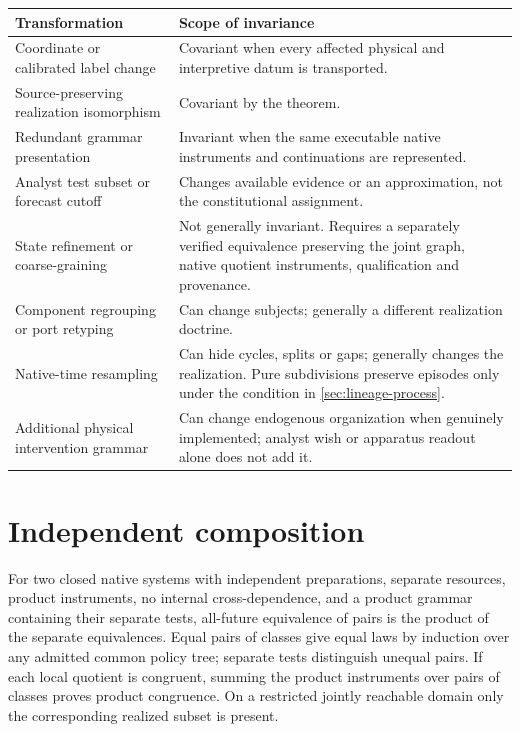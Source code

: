 \begin{center}\small
\begin{tabularx}{\textwidth}{@{}>{\raggedright\arraybackslash}p{}Y@{}}\toprule
Transformation & Scope of invariance\\\midrule
Coordinate or calibrated label change & Covariant when every affected physical and interpretive datum is transported.\\
Source-preserving realization isomorphism & Covariant by the theorem.\\
Redundant grammar presentation & Invariant when the same executable native instruments and continuations are represented.\\
Analyst test subset or forecast cutoff & Changes available evidence or an approximation, not the constitutional assignment.\\
State refinement or coarse-graining & Not generally invariant. Requires a separately verified equivalence preserving the joint graph, native quotient instruments, qualification and provenance.\\
Component regrouping or port retyping & Can change subjects; generally a different realization doctrine.\\
Native-time resampling & Can hide cycles, splits or gaps; generally changes the realization. Pure subdivisions preserve episodes only under the condition in \cref{sec:lineage-process}.\\
Additional physical intervention grammar & Can change endogenous organization when genuinely implemented; analyst wish or apparatus readout alone does not add it.\\\bottomrule
\end{tabularx}
\end{center}

\section{Independent composition}\label{section:completion:independent-composition}
For two closed native systems with independent preparations, separate resources, product instruments, no internal cross-dependence, and a product grammar containing their separate tests, all-future equivalence of pairs is the product of the separate equivalences. Equal pairs of classes give equal laws by induction over any admitted common policy tree; separate tests distinguish unequal pairs. If each local quotient is congruent, summing the product instruments over pairs of classes proves product congruence. On a restricted jointly reachable domain only the corresponding realized subset is present.

